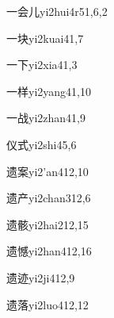 \begin{verbete}{一会儿}{yi2hui4r5}{1,6,2}
\end{verbete}

\begin{verbete}{一块}{yi2kuai4}{1,7}
\end{verbete}

\begin{verbete}{一下}{yi2xia4}{1,3}
\end{verbete}

\begin{verbete}{一样}{yi2yang4}{1,10}
\end{verbete}

\begin{verbete}{一战}{yi2zhan4}{1,9}
\end{verbete}

\begin{verbete}{仪式}{yi2shi4}{5,6}
\end{verbete}

\begin{verbete}{遗案}{yi2'an4}{12,10}
\end{verbete}

\begin{verbete}{遗产}{yi2chan3}{12,6}
\end{verbete}

\begin{verbete}{遗骸}{yi2hai2}{12,15}
\end{verbete}

\begin{verbete}{遗憾}{yi2han4}{12,16}
\end{verbete}

\begin{verbete}{遗迹}{yi2ji4}{12,9}
\end{verbete}

\begin{verbete}{遗落}{yi2luo4}{12,12}
\end{verbete}


